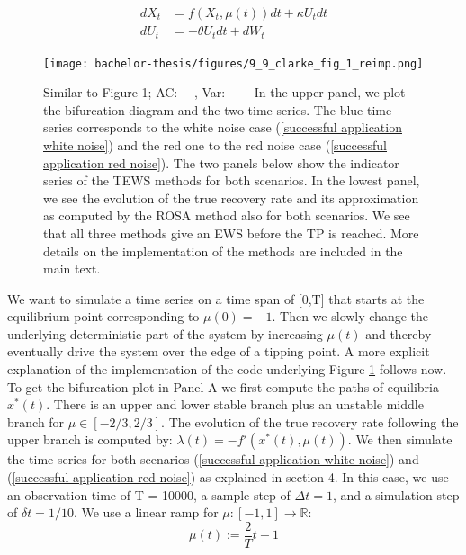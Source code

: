 \documentclass[%
thesis=student,%
coverpage=false,%
titlepage=false,%
headmarks=true, %
english,%
font=libertine, %
math=newpxtx, %
BCOR=5mm,%
coverBCOR=11mm%
]{tumbook}
\begin{document}
    \begin{equation}
        \begin{aligned}
            dX_{t} & = f(X_{t},\mu(t))dt + \kappa U_{t}dt \\
            dU_{t} & = -\theta U_{t} dt + dW_{t}
        \end{aligned}
        \label{successful application red noise}
    \end{equation}



\begin{figure}
    \centering
    \texttt{[image: bachelor-thesis/figures/9\_9\_clarke\_fig\_1\_reimp.png]}
    \caption{Similar to \cite{Clarke:2023} Figure 1; AC: ---, Var: - - -
    In the upper panel, we plot the bifurcation diagram and the two time series. The blue time series corresponds to the white noise case (\ref{successful application white noise}) and the red one to the red noise case (\ref{successful application red noise}). The two panels below show the indicator series of the TEWS methods for both scenarios. In the lowest panel, we see the evolution of the true recovery rate and its approximation as computed by the ROSA method also for both scenarios. We see that all three methods give an EWS before the TP is reached. More details on the implementation of the methods are included in the main text.
    }
    \label{success_of_trad_ews_and_rosa}
\end{figure}

We want to simulate a time series on a time span of [0,T] that starts at the equilibrium point corresponding to $\mu(0) = -1$. Then we slowly change the underlying deterministic part of the system by increasing $\mu(t)$ and thereby eventually drive the system over the edge of a tipping point. A more explicit explanation of the implementation of the code underlying Figure \ref{success_of_trad_ews_and_rosa} follows now. To get the bifurcation plot in Panel A we first compute the paths of equilibria $x^{*}(t)$. There is an upper and lower stable branch plus an unstable middle branch for $\mu \in [-2/3,2/3]$. The evolution of the true recovery rate following the upper branch is computed by: $\lambda(t) = -f'(x^{*}(t),\mu(t))$. We then simulate the time series for both scenarios (\ref{successful application white noise}) and (\ref{successful application red noise}) as explained in section 4. In this case, we use an observation time of T = 10000, a sample step of $\Delta t = 1$, and a simulation step of $\delta t = 1/10$. We use a linear ramp for $\mu:  [-1,1] \rightarrow \mathbb{R}$:
\[
\mu(t) := \frac{2}{T}t-1
\]
\end{document}
